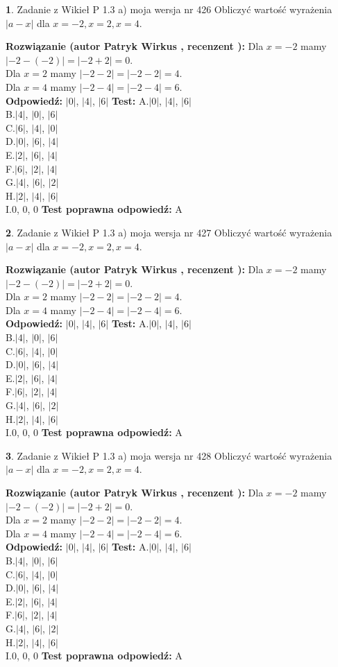 \documentclass[12pt, a4paper]{article}
\theoremstyle{definition} %
\newtheorem{zad}{}
\newcommand{\zadStart}[1]{\begin{zad}#1\newline}
\newcommand{\zadStop}{\end{zad}}
\newcommand{\rozwStart}[2]{\noindent \textbf{Rozwiązanie (autor #1 , recenzent #2): }\newline}
\newcommand{\rozwStop}{\newline}
\newcommand{\odpStart}{\noindent \textbf{Odpowiedź:}\newline}
\newcommand{\odpStop}{\newline}
\newcommand{\testStart}{\noindent \textbf{Test:}\newline}
\newcommand{\testStop}{\newline}
\newcommand{\kluczStart}{\noindent \textbf{Test poprawna odpowiedź:}\newline}
\newcommand{\kluczStop}{\newline}
\begin{document}
\zadStart{Zadanie z Wikieł P 1.3 a) moja wersja nr 426}
Obliczyć wartość wyrażenia $|a - x|$ dla $x=-2,x=2,x=4$.
\zadStop
\rozwStart{Patryk Wirkus}{}
Dla $x = -2$ mamy $|-2 - (-2)| = |-2 + 2| = 0$.\\
Dla $x = 2$ mamy $|-2 - 2| = |-2 - 2| = 4$.\\
Dla $x = 4$ mamy $|-2 - 4| = |-2 - 4| = 6$.\\
\rozwStop
\odpStart
$|0|$, $|4|$, $|6|$
\odpStop
\testStart
A.$|0|$, $|4|$, $|6|$\\
B.$|4|$, $|0|$, $|6|$\\
C.$|6|$, $|4|$, $|0|$\\
D.$|0|$, $|6|$, $|4|$\\
E.$|2|$, $|6|$, $|4|$\\
F.$|6|$, $|2|$, $|4|$\\
G.$|4|$, $|6|$, $|2|$\\
H.$|2|$, $|4|$, $|6|$\\
I.$0$, $0$, $0$
\testStop
\kluczStart
A
\kluczStop



\zadStart{Zadanie z Wikieł P 1.3 a) moja wersja nr 427}
Obliczyć wartość wyrażenia $|a - x|$ dla $x=-2,x=2,x=4$.
\zadStop
\rozwStart{Patryk Wirkus}{}
Dla $x = -2$ mamy $|-2 - (-2)| = |-2 + 2| = 0$.\\
Dla $x = 2$ mamy $|-2 - 2| = |-2 - 2| = 4$.\\
Dla $x = 4$ mamy $|-2 - 4| = |-2 - 4| = 6$.\\
\rozwStop
\odpStart
$|0|$, $|4|$, $|6|$
\odpStop
\testStart
A.$|0|$, $|4|$, $|6|$\\
B.$|4|$, $|0|$, $|6|$\\
C.$|6|$, $|4|$, $|0|$\\
D.$|0|$, $|6|$, $|4|$\\
E.$|2|$, $|6|$, $|4|$\\
F.$|6|$, $|2|$, $|4|$\\
G.$|4|$, $|6|$, $|2|$\\
H.$|2|$, $|4|$, $|6|$\\
I.$0$, $0$, $0$
\testStop
\kluczStart
A
\kluczStop



\zadStart{Zadanie z Wikieł P 1.3 a) moja wersja nr 428}
Obliczyć wartość wyrażenia $|a - x|$ dla $x=-2,x=2,x=4$.
\zadStop
\rozwStart{Patryk Wirkus}{}
Dla $x = -2$ mamy $|-2 - (-2)| = |-2 + 2| = 0$.\\
Dla $x = 2$ mamy $|-2 - 2| = |-2 - 2| = 4$.\\
Dla $x = 4$ mamy $|-2 - 4| = |-2 - 4| = 6$.\\
\rozwStop
\odpStart
$|0|$, $|4|$, $|6|$
\odpStop
\testStart
A.$|0|$, $|4|$, $|6|$\\
B.$|4|$, $|0|$, $|6|$\\
C.$|6|$, $|4|$, $|0|$\\
D.$|0|$, $|6|$, $|4|$\\
E.$|2|$, $|6|$, $|4|$\\
F.$|6|$, $|2|$, $|4|$\\
G.$|4|$, $|6|$, $|2|$\\
H.$|2|$, $|4|$, $|6|$\\
I.$0$, $0$, $0$
\testStop
\kluczStart
A
\kluczStop
\end{document}
